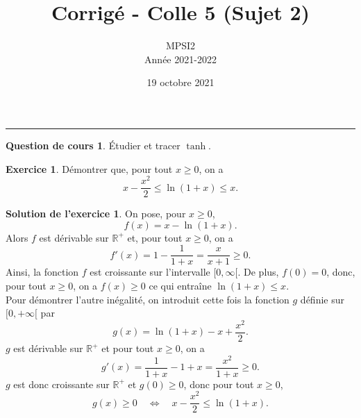 \documentclass[a4paper, 11pt,openany]{article}%
\title{Corrigé - Colle 5 (Sujet 2)}
\author{MPSI2\\
Année 2021-2022}
\date{19 octobre 2021}
\theoremstyle{plain}
\theoremstyle{definition}
\newtheorem{cours}{Question de cours}
\newtheorem{exo}{Exercice}
\newtheorem{sol}{Solution de l'exercice}
\theoremstyle{remark}
\newcommand{\R}{\mathbb{R}}
\begin{document}
   \maketitle
      \rule{\linewidth}{0.5mm}


\begin{cours}
Étudier et tracer $\tanh$.
\end{cours}

\begin{exo}
Démontrer que, pour tout $x \geqslant 0$, on a
\[  x- \frac{x^2}{2} \leqslant \ln(1+x) \leqslant x.\]
\end{exo}

\begin{sol}
On pose, pour $x \geqslant 0$, 
\[ f(x)= x- \ln(1+x).\]
Alors $f$ est dérivable sur $\R^+$ et, pour tout $x \geqslant 0$, on a 
\[ f'(x)=1- \frac{1}{1+x} = \frac{x}{x+1} \geqslant 0.\] Ainsi, la fonction $f$ est croissante sur l'intervalle $[0, \infty [$. De plus, $f(0)=0$, donc, pour tout $x \geqslant 0$, on a $f(x) \geqslant 0$ ce qui entraîne $\ln(1+x)\leqslant x$.\\
Pour démontrer l'autre inégalité, on introduit cette fois la fonction $g$ définie sur $[0,+\infty[$ par 
\[g(x)=\ln(1+x)-x+ \frac{x^2}{2}.\]
$g$ est dérivable sur $\R^+$ et pour tout $x \geqslant 0$, on a
\[ g'(x)=\frac{1}{1+x}-1+x= \frac{x^2}{1+x} \geqslant 0.\]
$g$ est donc croissante sur $\R^+$ et $g(0)\geqslant 0$, donc pour tout $x \geqslant 0$, 
\[ g(x) \geqslant 0 \quad \Leftrightarrow \quad  x- \frac{x^2}{2} \leqslant \ln(1+x).\]
\end{sol}
\end{document}

